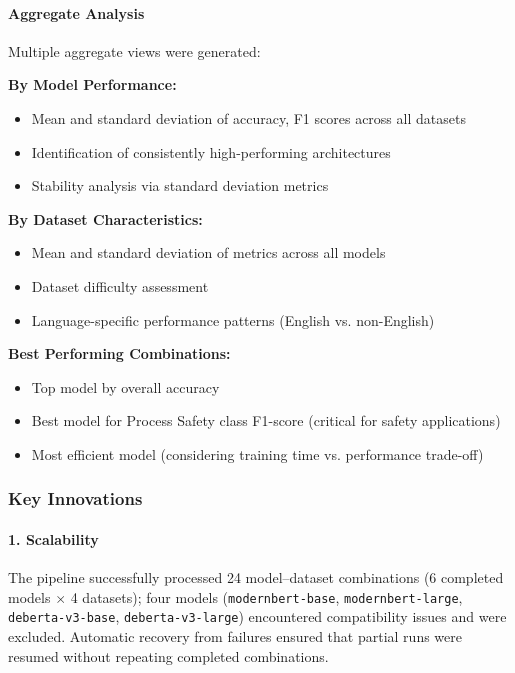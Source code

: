 \documentclass[11pt, titlepage, bibliography=totoc]{scrreprt}
\begin{document}
\paragraph{Aggregate Analysis}
Multiple aggregate views were generated:

\textbf{By Model Performance:}
\begin{itemize}
    \item Mean and standard deviation of accuracy, F1 scores across all datasets
    \item Identification of consistently high-performing architectures
    \item Stability analysis via standard deviation metrics
\end{itemize}

\textbf{By Dataset Characteristics:}
\begin{itemize}
    \item Mean and standard deviation of metrics across all models
    \item Dataset difficulty assessment
    \item Language-specific performance patterns (English vs. non-English)
\end{itemize}

\textbf{Best Performing Combinations:}
\begin{itemize}
    \item Top model by overall accuracy
    \item Best model for Process Safety class F1-score (critical for safety applications)
    \item Most efficient model (considering training time vs. performance trade-off)
\end{itemize}

\subsubsection{Key Innovations}

\paragraph{1. Scalability}
The pipeline successfully processed 24 model--dataset combinations (6 completed models $\times$ 4 datasets); four models (\texttt{modernbert-base}, \texttt{modernbert-large}, \texttt{deberta-v3-base}, \texttt{deberta-v3-large}) encountered compatibility issues and were excluded. Automatic recovery from failures ensured that partial runs were resumed without repeating completed combinations.
\end{document}
